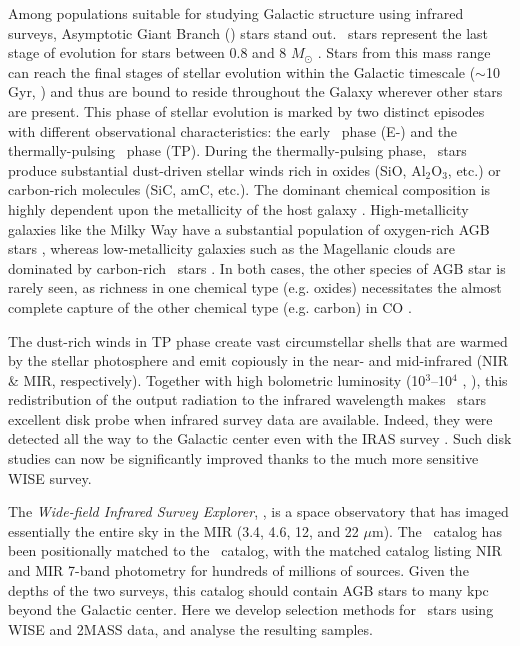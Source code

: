 Among populations suitable for studying Galactic structure using infrared surveys, Asymptotic Giant 
Branch (\agb) stars stand out. \agb\ stars represent the last stage of evolution for stars between 0.8 and 8 $M_\odot$ \citep{1983ARA&A..21..271I, 2005ARA&A..43..435H}. Stars from this mass range can reach the final stages of stellar evolution within the Galactic timescale ($\sim$10 Gyr, \citealt{1983ARA&A..21..271I}) and thus are bound to reside throughout the Galaxy wherever other stars are present. This phase of stellar evolution is marked by two distinct
episodes with different observational characteristics: the early \agb\, phase (E-\agb)  and the thermally-pulsing \agb\, phase (TP). During the thermally-pulsing phase, \agb\, stars produce substantial dust-driven stellar winds \citep[$10^{-7} < \dot{M} < 10^{-4}$ $M_\odot$ yr$^{-1}$,][]{2002A&A...391.1053O} rich in oxides (SiO, Al$_2$O$_3$, etc.) or carbon-rich molecules (SiC, amC, etc.). The dominant chemical composition is highly dependent upon the metallicity of the host galaxy \citep{2005A&A...434..691M}. High-metallicity galaxies like  the Milky Way have a substantial population of oxygen-rich AGB stars \citep{1985A&A...152L...1H}, whereas low-metallicity galaxies such as the Magellanic clouds are dominated by carbon-rich \agb\ stars \citep{2011AJ....142..103B}. In both cases, the other species of AGB star is rarely seen, as richness in one chemical type (e.g. oxides)  necessitates the almost complete capture of the other chemical type (e.g. carbon) in CO \citep{1983ARA&A..21..271I}. 

The dust-rich winds in TP phase  create vast circumstellar shells that are warmed by the stellar photosphere and emit
copiously in the near- and mid-infrared (NIR \& MIR, respectively). Together with high bolometric luminosity
(10$^3$--10$^4$ \Mo, \citealt{2001ApJ...552..787K}), this redistribution of the output radiation to the infrared wavelength makes \agb\ stars
excellent disk probe when infrared survey data are available. Indeed, they were detected all the way to the 
Galactic center even with the IRAS survey \citep{2002MNRAS.337..749J}. Such disk studies can now be significantly
improved thanks to the much more sensitive WISE survey. 

The \emph{Wide-field Infrared Survey Explorer}, \wise, is a space observatory that has imaged essentially the entire sky in the MIR (3.4, 4.6, 12, and 22 $\mu$m). The \wise\, catalog has been positionally matched to the \twomass\ catalog, with the matched catalog listing NIR and MIR 7-band photometry for
hundreds of millions of sources. Given the depths of the two surveys, this catalog should contain AGB stars to many
kpc beyond the Galactic center. Here we develop selection methods for \agb\ stars using WISE and 2MASS data,
and analyse the resulting samples. 

